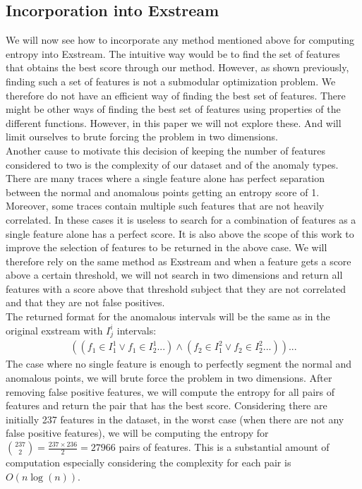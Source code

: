\documentclass[oneside, a4paper, onecolumn, 11pt]{article}
\begin{document}
\subsection{Incorporation into Exstream}
We will now see how to incorporate any method mentioned above for computing entropy into Exstream. The intuitive way would be to find the set of features that obtains the best score through our method. However, as shown previously, finding such a set of features is not a submodular optimization problem. We therefore do not have an efficient way of finding the best set of features. There might be other ways of finding the best set of features using properties of the different functions. However, in this paper we will not explore these. And will limit ourselves to brute forcing the problem in two dimensions.\\
Another cause to motivate this decision of keeping the number of features considered to two is the complexity of our dataset and of the anomaly types. There are many traces where a single feature alone has perfect separation between the normal and anomalous points getting an entropy score of 1. Moreover, some traces contain multiple such features that are not heavily correlated. In these cases it is useless to search for a combination of features as a single feature alone has a perfect score. It is also above the scope of this work to improve the selection of features to be returned in the above case. We will therefore rely on the same method as Exstream and when a feature gets a score above a certain threshold, we will not search in two dimensions and return all features with a score above that threshold subject that they are not correlated and that they are not false positives.\\
The returned format for the anomalous intervals will be the same as in the original exstream with $I^i_j$ intervals: 
\begin{align*}
  ((f_1 \in I^1_1 \lor f_1 \in I^1_2 ...) \land (f_2 \in I^2_1 \lor f_2 \in I^2_2 ...)) ...
\end{align*}
The case where no single feature is enough to perfectly segment the normal and anomalous points, we will brute force the problem in two dimensions. After removing false positive features, we will compute the entropy for all pairs of features and return the pair that has the best score. Considering there are initially 237 features in the dataset, in the worst case (when there are not any false positive features), we will be computing the entropy for ${237\choose2} = \frac{237 \times 236}{2} = 27966$ pairs of features. This is a substantial amount of computation especially considering the complexity for each pair is $O(n \log(n))$. \\
\end{document}
